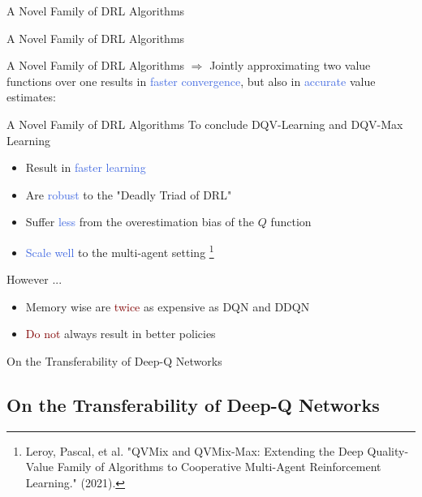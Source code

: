 \documentclass{beamer}
\begin{document}
\begin{frame}{A Novel Family of DRL Algorithms}
	
\end{frame}

\begin{frame}{A Novel Family of DRL Algorithms}
	
\end{frame}

\begin{frame}{A Novel Family of DRL Algorithms}
	$\Rightarrow$ Jointly approximating two value functions over one results in \textcolor{RoyalBlue}{faster convergence}, but also in \textcolor{RoyalBlue}{accurate} value estimates:

	

\end{frame}

\begin{frame}{A Novel Family of DRL Algorithms}
	To conclude DQV-Learning and DQV-Max Learning

	\begin{itemize}
		\item Result in \textcolor{RoyalBlue}{faster learning}
		\item Are \textcolor{RoyalBlue}{robust} to the "Deadly Triad of DRL"
		\item Suffer \textcolor{RoyalBlue}{less} from the overestimation bias of the $Q$ function 
		\item \textcolor{RoyalBlue}{Scale well} to the multi-agent setting \footnote{Leroy, Pascal, et al. "QVMix and QVMix-Max: Extending the Deep Quality-Value Family of Algorithms to Cooperative Multi-Agent Reinforcement Learning." (2021).}
	\end{itemize}

	However ... 

	\begin{itemize}
		\item Memory wise are \textcolor{Maroon}{twice} as expensive as DQN and DDQN
		\item \textcolor{Maroon}{Do not} always result in better policies
	\end{itemize}

\end{frame}


\begin{frame}{On the Transferability of Deep-Q Networks}
	\subsection{On the Transferability of Deep-Q Networks}

\end{frame}
\end{document}
